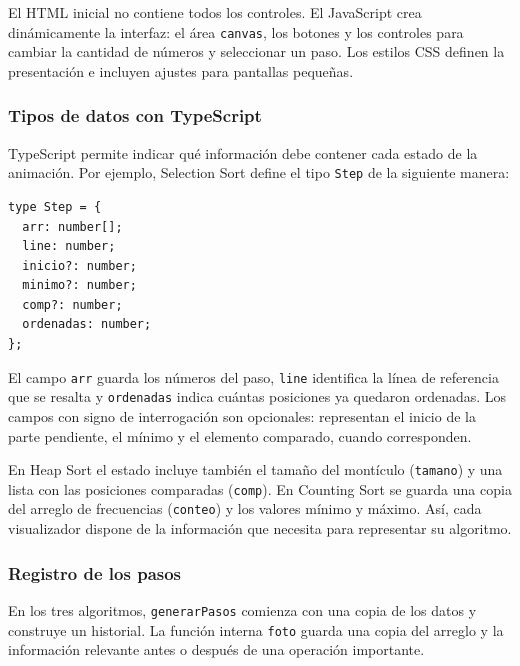 \documentclass[12pt,a4paper]{article}
\begin{document}
El HTML inicial no contiene todos los controles. El JavaScript crea dinámicamente la interfaz: el área \texttt{canvas}, los botones y los controles para cambiar la cantidad de números y seleccionar un paso. Los estilos CSS definen la presentación e incluyen ajustes para pantallas pequeñas.

\subsubsection{Tipos de datos con TypeScript}

TypeScript permite indicar qué información debe contener cada estado de la animación. Por ejemplo, Selection Sort define el tipo \texttt{Step} de la siguiente manera:

\begin{lstlisting}[caption={Tipo de estado en Selection Sort}]
type Step = {
  arr: number[];
  line: number;
  inicio?: number;
  minimo?: number;
  comp?: number;
  ordenadas: number;
};
\end{lstlisting}

El campo \texttt{arr} guarda los números del paso, \texttt{line} identifica la línea de referencia que se resalta y \texttt{ordenadas} indica cuántas posiciones ya quedaron ordenadas. Los campos con signo de interrogación son opcionales: representan el inicio de la parte pendiente, el mínimo y el elemento comparado, cuando corresponden.

En Heap Sort el estado incluye también el tamaño del montículo (\texttt{tamano}) y una lista con las posiciones comparadas (\texttt{comp}). En Counting Sort se guarda una copia del arreglo de frecuencias (\texttt{conteo}) y los valores mínimo y máximo. Así, cada visualizador dispone de la información que necesita para representar su algoritmo.

\subsubsection{Registro de los pasos}

En los tres algoritmos, \texttt{generarPasos} comienza con una copia de los datos y construye un historial. La función interna \texttt{foto} guarda una copia del arreglo y la información relevante antes o después de una operación importante.
\end{document}
